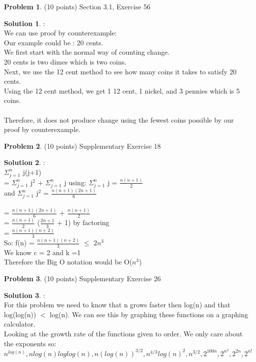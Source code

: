 \documentclass{article}
\theoremstyle{definition}
\newtheorem{problem}{Problem}
\newtheorem*{solution}{Solution}
\begin{document}
\newpage


\begin{problem} (10 points) Section 3.1, Exercise 56
\end{problem}
\begin{solution}:
\\
We can use proof by counterexample:
\\ Our example could be : 20 cents.
\\ We first start with the normal way of counting change.
\\ 20 cents is two dimes which is two coins.
\\ Next, we use the 12 cent method to see how many coins it takes to satisfy 20 cents.
\\ Using the 12 cent method, we get 1 12 cent, 1 nickel, and 3 pennies which is 5 coins.
\\
\\
Therefore, it does not produce change using the fewest coins possible by our proof by counterexample. 
\end{solution}

\newpage


\begin{problem} (10 points) Supplementary Exercise 18
\end{problem}
\begin{solution}:
\\
$\Sigma_{j=1}^n$ j(j+1)
\\
= $\Sigma_{j=1}^n$ j$^2$ + $\Sigma_{j=1}^n$ j 
using: $\Sigma_{j=1}^n$ j  =  $\frac {n(n+1)} {2} $
\\
and $\Sigma_{j=1}^n$ j$^2$ = $\frac{n(n+1)(2n+1)}{6}$
\\
\\
= $\frac{n(n+1)(2n+1)}{6}$ + $\frac {n(n+1)} {2} $
\\
= $\frac {n(n+1)} {2} $ ($\frac{2n+1}{3}$ + 1)     by factoring
\\
= $\frac {n(n+1)(n+2)}{3}$
\\
So: f(n) = $\frac {n(n+1)(n+2)}{3}$ $\leq$ $2n^3$
\\
We know c = 2 and k =1 
\\ Therefore the Big O notation would be O($n^3$)
\end{solution}

\newpage


\begin{problem} (10 points) Supplementary Exercise 26
\end{problem}
\begin{solution}:
\\
For this problem we need to know that n grows faster then log(n) and that log(log(n)) $<$ log(n). We can see this by graphing these functions on a graphing calculator.
\\
Looking at the growth rate of the functions given to order. We only care about the exponents so:
\\
$n^{log(n)} , nlog(n)loglog(n), n(log(n))^{3/2}, n^{4/3}log(n)^2, n^{3/2}, 2^{100n}, 2^{n^2}, 2^{2n}, 2^{n!}$
\end{solution}
\end{document}
